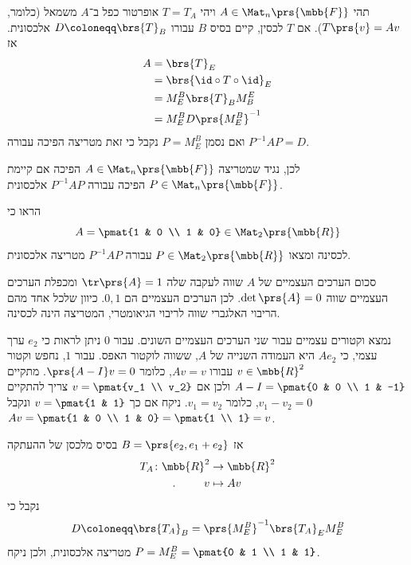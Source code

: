 \documentclass[a4paper,10pt,twoside,openany]{book}
\begin{document}
\begin{definition}
תהי
$A \in \Mat_{n}\prs{\mbb{F}}$
ויהי
$T = T_A$
אופרטור כפל ב־$
A$
משמאל (כלומר,
$T\prs{v} = Av$).
אם
$T$
לכסין, קיים בסיס
$B$
עבורו
$D \coloneqq \brs{T}_B$
אלכסונית.
אז
\begin{align*}
A &= \brs{T}_E
\\&= \brs{\id \circ T \circ \id}_E
\\&= M^B_E \brs{T}_B M^E_B
\\&= M^B_E D \prs{M^B_E}^{-1}
\end{align*}
ואם נסמן
$P = M^B_E$
נקבל כי זאת מטריצה הפיכה עבורה
$P^{-1} A P = D$.

לכן, נגיד שמטריצה
$A \in \Mat_n\prs{\mbb{F}}$
הפיכה אם קיימת
$P \in \Mat_n\prs{\mbb{F}}$
הפיכה עבורה
$P^{-1} A P$
אלכסונית.
\end{definition}

\begin{exercisechap}
הראו כי
\[A = \pmat{1 & 0 \\ 1 & 0} \in \Mat_2\prs{\mbb{R}}\]
לכסינה ומצאו
$P \in \Mat_2\prs{\mbb{R}}$
עבורה
$P^{-1}AP$
מטריצה אלכסונית.
\end{exercisechap}

\begin{solution}
סכום הערכים העצמיים של
$A$
שווה לעקבה שלה
$\tr\prs{A} = 1$
ומכפלת הערכים העצמיים שווה
$\det\prs{A} = 0$.
לכן הערכים העצמיים הם
$0,1$.
כיוון שלכל אחד מהם הריבוי האלגברי שווה לריבוי הגיאומטרי, המטריצה הינה לכסינה.

נמצא וקטורים עצמיים עבור שני הערכים העצמיים השונים.
עבור
$0$
ניתן לראות כי
$e_2$
ערך עצמי, כי
$A e_2$
היא העמודה השנייה של
$A$,
ששווה לוקטור האפס.
עבור
$1$,
נחפש וקטור
$v \in \mbb{R}^2$
עבורו
$Av = v$,
כלומר
$\prs{A - I}v = 0$.
מתקיים
$A - I = \pmat{0 & 0 \\ 1 & -1}$
ולכן אם
$v = \pmat{v_1 \\ v_2}$
צריך להתקיים
$v_1 - v_2 = 0$,
כלומר
$v_1 = v_2$.
ניקח אם כך
$v = \pmat{1 & 1}$
ונקבל
$Av = \pmat{1 & 0 \\ 1 & 0} = \pmat{1 \\ 1} = v$.

אז
$B = \prs{e_2, e_1 + e_2}$
בסיס מלכסן של ההעתקה
\begin{align*}
T_A \colon \mbb{R}^2 &\to \mbb{R}^2 \\
\text{.} \hphantom{lalala} v &\mapsto Av
\end{align*}
נקבל כי
\[D \coloneqq \brs{T_A}_B = \prs{M^B_E}^{-1} \brs{T_A}_E M^B_E\]
מטריצה אלכסונית, ולכן ניקח
$P = M^B_E = \pmat{0 & 1 \\ 1 & 1}$.
\end{solution}
\end{document}

